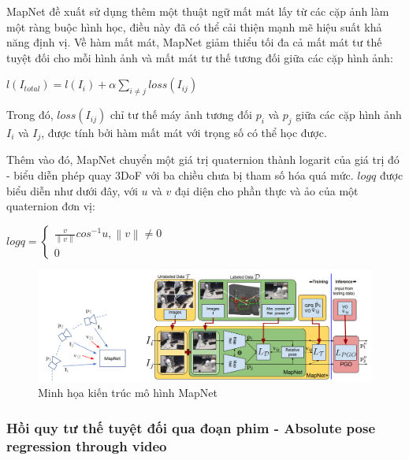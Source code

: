 MapNet \cite{brahmbhatt2018geometryaware} đề xuất sử dụng thêm một thuật ngữ mất mát lấy từ các cặp ảnh làm một ràng buộc hình học, điều này đã có thể cải thiện mạnh mẽ hiệu suất khả năng định vị. Về hàm mất mát, MapNet giảm thiểu tối đa cả mất mát tư thế tuyệt đối cho mỗi hình ảnh và mất mát tư thế tương đối giữa các cặp hình ảnh:
\begin{center}
    $l(I_{total}) = l(I_i) + \alpha\sum_{i\neq j}loss(I_{ij} )$
\end{center}
Trong đó, $loss(I_{ij} )$ chỉ tư thế máy ảnh tương đối $p_i$ và $p_j$ giữa các cặp hình ảnh $I_i$ và $I_j$, được tính bởi hàm mất mát với trọng số có thể học được.

Thêm vào đó, MapNet chuyển một giá trị quaternion thành logarit của giá trị đó - biểu diễn phép quay 3DoF với ba chiều chưa bị tham số hóa quá mức. $logq$ được biểu diễn như dưới đây, với $u$ và $v$ đại diện cho phần thực và ảo của một quaternion đơn vị:
\begin{center}
    $logq =
        \begin{cases}
            \frac{v}{\left \| v \right \|}cos^{-1}u, \left \| v \right \| \neq 0 \\
            0
        \end{cases}$
\end{center}
\begin{figure}[H]
    \centering
    \includegraphics[width=\textwidth]{pics/Chapter2/mapnet.png}
    \caption{Minh họa kiến trúc mô hình MapNet \cite{brahmbhatt2018geometryaware}}
\end{figure}

\subsubsection*{Hồi quy tư thế tuyệt đối qua đoạn phim - Absolute pose regression through video}

